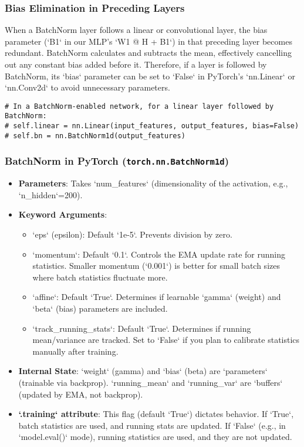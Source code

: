 \subsubsection{Bias Elimination in Preceding Layers}
When a BatchNorm layer follows a linear or convolutional layer, the bias parameter (`B1` in our MLP's `W1 @ H + B1`) in that preceding layer becomes redundant. BatchNorm calculates and subtracts the mean, effectively cancelling out any constant bias added before it. Therefore, if a layer is followed by BatchNorm, its `bias` parameter can be set to `False` in PyTorch's `nn.Linear` or `nn.Conv2d` to avoid unnecessary parameters.

\begin{lstlisting}
# In a BatchNorm-enabled network, for a linear layer followed by BatchNorm:
# self.linear = nn.Linear(input_features, output_features, bias=False)
# self.bn = nn.BatchNorm1d(output_features)
\end{lstlisting}

\subsubsection{BatchNorm in PyTorch (\texttt{torch.nn.BatchNorm1d})}
\begin{itemize}
    \item \textbf{Parameters}: Takes `num_features` (dimensionality of the activation, e.g., `n_hidden`=200).
    \item \textbf{Keyword Arguments}:
        \begin{itemize}
            \item `eps` (epsilon): Default `1e-5`. Prevents division by zero.
            \item `momentum`: Default `0.1`. Controls the EMA update rate for running statistics. Smaller momentum (`0.001`) is better for small batch sizes where batch statistics fluctuate more.
            \item `affine`: Default `True`. Determines if learnable `gamma` (weight) and `beta` (bias) parameters are included.
            \item `track_running_stats`: Default `True`. Determines if running mean/variance are tracked. Set to `False` if you plan to calibrate statistics manually after training.
        \end{itemize}
    \item \textbf{Internal State}: `weight` (gamma) and `bias` (beta) are `parameters` (trainable via backprop). `running_mean` and `running_var` are `buffers` (updated by EMA, not backprop).
    \item \textbf{`.training` attribute}: This flag (default `True`) dictates behavior. If `True`, batch statistics are used, and running stats are updated. If `False` (e.g., in `model.eval()` mode), running statistics are used, and they are not updated.
\end{itemize}

